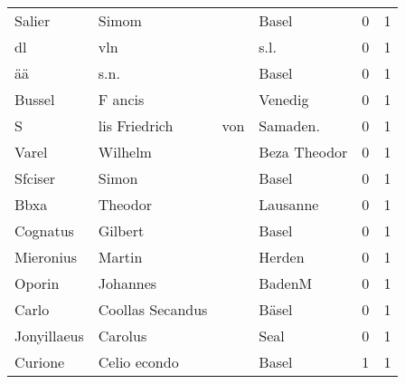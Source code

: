 \begin{tabular}{llllrr}
                   Salier &                              Simom &             &                                       Basel &          0 &         1 \\
                       dl &                                vln &             &                                        s.l. &          0 &         1 \\
                       ää &                               s.n. &             &                                       Basel &          0 &         1 \\
                   Bussel &                            F ancis &             &                                     Venedig &          0 &         1 \\
                        S &                      lis Friedrich &         von &                                   Samaden.  &          0 &         1 \\
                    Varel &                            Wilhelm &             &                                Beza Theodor &          0 &         1 \\
                  Sfciser &                              Simon &             &                                       Basel &          0 &         1 \\
                     Bbxa &                            Theodor &             &                                    Lausanne &          0 &         1 \\
                 Cognatus &                            Gilbert &             &                                       Basel &          0 &         1 \\
                Mieronius &                             Martin &             &                                      Herden &          0 &         1 \\
                   Oporin &                           Johannes &             &                                      BadenM &          0 &         1 \\
                    Carlo &                   Coollas Secandus &             &                                       Bäsel &          0 &         1 \\
              Jonyillaeus &                            Carolus &             &                                        Seal &          0 &         1 \\
                  Curione &                       Celio econdo &             &                                       Basel &          1 &         1 \\

\end{tabular}
